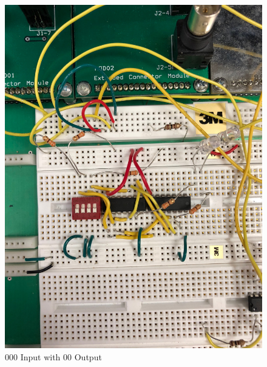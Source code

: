 \documentclass[10pt]{article}
\begin{document}
\begin{centering}
	\begin{figure} [H]
		\centering
		\includegraphics[scale=0.07]{images/000led.jpg}
		\caption{000 Input with 00 Output}
	\end{figure}
\end{centering}
\end{document}
